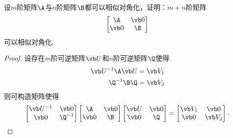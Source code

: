 \begin{example}
设\(m\)阶矩阵\(\A\)与\(n\)阶矩阵\(\B\)都可以相似对角化，证明：\(m+n\)阶矩阵\[
	\begin{bmatrix} \A & \vb0 \\ \vb0 & \B \end{bmatrix}
\]可以相似对角化.
\begin{proof}
设存在\(m\)阶可逆矩阵\(\P\)和\(n\)阶可逆矩阵\(\Q\)使得
\begin{align*}
	\P^{-1}\A\P &= \V_1 \\
	\Q^{-1}\B\Q &= \V_2
\end{align*}
则可构造矩阵使得\[
	\begin{bmatrix}
		\P^{-1} & \vb0 \\
		\vb0 & \Q^{-1}
	\end{bmatrix}
	\begin{bmatrix} \A & \vb0 \\ \vb0 & \B \end{bmatrix}
	\begin{bmatrix}
		\P & \vb0 \\
		\vb0 & \Q
	\end{bmatrix}
	= \begin{bmatrix}
		\V_1 & \vb0 \\
		\vb0 & \V_2
	\end{bmatrix}.
	\qedhere
\]
\end{proof}
\end{example}

